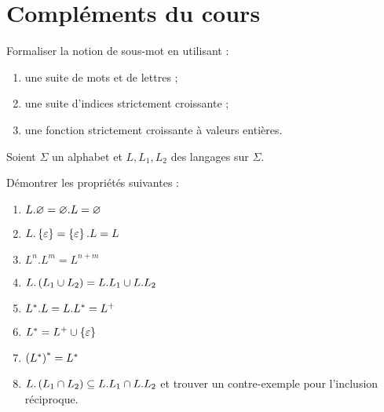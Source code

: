\section*{Compléments du cours}

\begin{exo}
Formaliser la notion de sous-mot en utilisant :

\begin{enumerate}
    \item une suite de mots et de lettres ; \\
    \item une suite d'indices strictement croissante ; \\
    \item une fonction strictement croissante à valeurs entières.
\end{enumerate}
\end{exo}

\begin{exo}
Soient \(\Sigma\) un alphabet et \(L,L_1,L_2\) des langages sur \(\Sigma\).

Démontrer les propriétés suivantes :

\begin{enumerate}
    \item \(L.\varnothing=\varnothing.L=\varnothing\) \\
    \item \(L.\left\lbrace\varepsilon\right\rbrace=\left\lbrace\varepsilon\right\rbrace.L=L\) \\
    \item \(L^n.L^m=L^{n+m}\) \\
    \item \(L.\left(L_1\cup L_2\right)=L.L_1\cup L.L_2\) \\
    \item \(L^{*}.L=L.L^{*}=L^+\) \\
    \item \(L^{*}=L^+\cup\left\lbrace\varepsilon\right\rbrace\) \\
    \item \(\left(L^{*}\right)^{*}=L^{*}\) \\
    \item \(L.\left(L_1\cap L_2\right)\subseteq L.L_1\cap L.L_2\) et trouver un contre-exemple pour l'inclusion réciproque.
\end{enumerate}
\end{exo}

